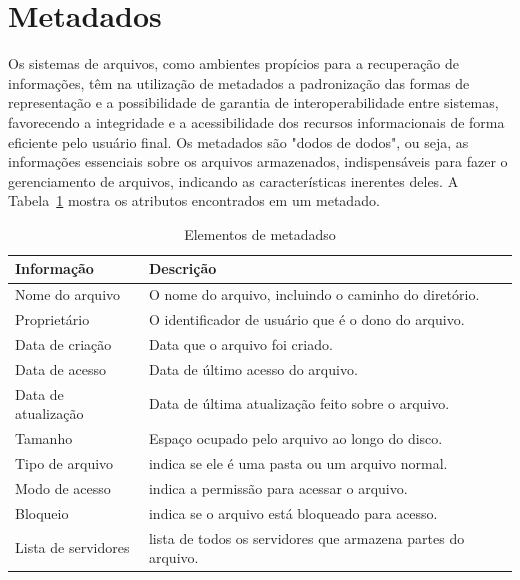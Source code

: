 	\section{Metadados} 
	
	Os sistemas de arquivos, como ambientes propícios para a recuperação de informações, têm na utilização de metadados a padronização das formas de representação e a possibilidade de garantia de interoperabilidade entre sistemas, favorecendo a integridade e a acessibilidade dos recursos informacionais de forma eficiente pelo usuário final. Os metadados são "dodos de dodos", ou seja, as informações essenciais sobre os arquivos armazenados, indispensáveis para fazer o gerenciamento de arquivos, indicando as características inerentes deles. A Tabela~\ref{tab:metadado} mostra os atributos encontrados em um metadado.
	
	\capstartfalse
	\begin{table} [htb]
		\caption{Elementos de metadadso}
		\centering
		\begin{tabular}{|l|l|} \hline
			\textbf{Informação} & \textbf{Descrição} \\ \hline
			
			Nome do arquivo		& O nome do arquivo, incluindo o caminho do diretório.\\ \hline
			Proprietário		& O identificador de usuário que é o dono do arquivo.\\ \hline
			Data de criação     & Data que o arquivo foi criado.\\ \hline
			Data de acesso		& Data de último acesso do arquivo. \\ \hline
			Data de atualização	& Data de última atualização feito sobre o arquivo. \\ \hline
			Tamanho				& Espaço ocupado pelo arquivo ao longo do disco. \\ \hline
			Tipo de arquivo		& indica se ele é uma pasta ou um arquivo normal.  \\ \hline
			Modo de acesso		& indica a permissão para acessar o arquivo. \\ \hline
			Bloqueio			& indica se o arquivo está bloqueado para acesso. \\ \hline
			Lista de servidores	& lista de todos os servidores que armazena partes do arquivo. \\ \hline
			
		\end{tabular}
		\label{tab:metadado}
	\end{table}
	\capstarttrue

